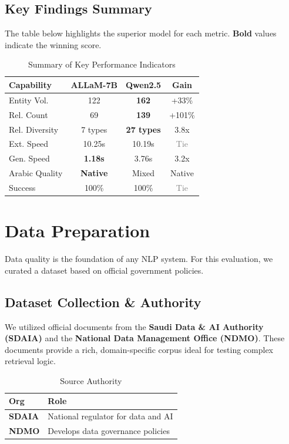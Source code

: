 \documentclass[11pt, onecolumn]{article}
\begin{document}
\subsection{Key Findings Summary}
The table below highlights the superior model for each metric. \textbf{Bold} values indicate the winning score.

\begin{table}[H]
    \centering
    \begin{tabular}{lccc}
        \toprule
        \textbf{Capability} & \textbf{ALLaM-7B} & \textbf{Qwen2.5} & \textbf{Gain} \\
        \midrule
        Entity Vol. & 122 & \textbf{162} & \textcolor{qwengreen}{+33\%} \\
        Rel. Count & 69 & \textbf{139} & \textcolor{qwengreen}{+101\%} \\
        Rel. Diversity & 7 types & \textbf{27 types} & \textcolor{qwengreen}{3.8x} \\
        Ext. Speed & 10.25s & 10.19s & \textcolor{gray}{Tie} \\
        Gen. Speed & \textbf{1.18s} & 3.76s & \textcolor{allamblue}{3.2x} \\
        Arabic Quality & \textbf{Native} & Mixed & \textcolor{allamblue}{Native} \\
        Success & 100\% & 100\% & \textcolor{gray}{Tie} \\
        \bottomrule
    \end{tabular}
    \caption{Summary of Key Performance Indicators}
\end{table}

\section{Data Preparation}
Data quality is the foundation of any NLP system. For this evaluation, we curated a dataset based on official government policies.

\subsection{Dataset Collection \& Authority}
We utilized official documents from the \textbf{Saudi Data \& AI Authority (SDAIA)} and the \textbf{National Data Management Office (NDMO)}. These documents provide a rich, domain-specific corpus ideal for testing complex retrieval logic.

\begin{table}[H]
    \centering
    \begin{tabular}{lp{8cm}}
        \toprule
        \textbf{Org} & \textbf{Role} \\
        \midrule
        \textbf{SDAIA} & National regulator for data and AI \\
        \textbf{NDMO} & Develops data governance policies \\
        \bottomrule
    \end{tabular}
    \caption{Source Authority}
\end{table}
\end{document}
